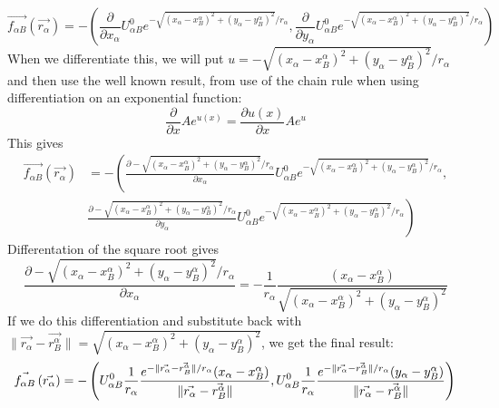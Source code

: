 \begin{itemize}
\begin{equation}
    \vec{f_{\alpha B}} \left( \vec{r_{\alpha}} \right) 
=-\left( \frac{\partial}{\partial x_{\alpha}}U^0_{\alpha B} e^{-\sqrt{(x_{\alpha}-x^{\alpha}_{B})^2+(y_{\alpha}-y^{\alpha}_B)^2} / r_{\alpha} }, \frac{\partial}{\partial y_{\alpha}}U^0_{\alpha B} e^{- \sqrt{(x_{\alpha}-x^{\alpha}_{B})^2+(y_{\alpha}-y^{\alpha}_B)^2} / r_{\alpha} } \right)
\end{equation}
When we differentiate this, we will put $u=-\sqrt{(x_{\alpha}-x^{\alpha}_{B})^2+(y_{\alpha}-y^{\alpha}_B)^2} / r_{\alpha} $ and then use the well known result, from use of the chain rule when using differentiation on an exponential function:
\begin{equation}
\frac{\partial }{\partial x}Ae^{u(x)}=\frac{\partial u(x)}{\partial x}Ae^{u}
\end{equation}
This gives
\begin{equation}
\begin{split}
    \vec{f_{\alpha B}} \left( \vec{r_{\alpha}} \right) 
 & =-\left( \frac{\partial -\sqrt{(x_{\alpha}-x^{\alpha}_{B})^2+(y_{\alpha}-y^{\alpha}_B)^2} / r_{\alpha}}{\partial  x_{\alpha}}U^0_{\alpha B} e^{-\sqrt{(x_{\alpha}-x^{\alpha}_{B})^2+(y_{\alpha}-y^{\alpha}_B)^2} / r_{\alpha} } \right. , \\
& \left. \frac{\partial -\sqrt{(x_{\alpha}-x^{\alpha}_{B})^2+(y_{\alpha}-y^{\alpha}_B)^2} / r_{\alpha}}{\partial y_{\alpha}}U^0_{\alpha B} e^{- \sqrt{(x_{\alpha}-x^{\alpha}_{B})^2+(y_{\alpha}-y^{\alpha}_B)^2} / r_{\alpha} } \right)
\end{split}
\end{equation}
Differentation of the square root gives 
\begin{equation}
 \frac{\partial -\sqrt{(x_{\alpha}-x^{\alpha}_{B})^2+(y_{\alpha}-y^{\alpha}_B)^2} / r_{\alpha}}{\partial x_{\alpha}} =-\frac{1}{r_{\alpha}}\frac{(x_{\alpha}-x_{B}^{\alpha})}{\sqrt{(x_{\alpha}-x^{\alpha}_{B})^2+(y_{\alpha}-y^{\alpha}_B)^2} }
\end{equation}
If we do this differentiation and substitute back with $\| \vec{r_{\alpha}} - \vec{r_{B}^{\alpha}} \|= \sqrt{(x_{\alpha}-x^{\alpha}_{B})^2+(y_{\alpha}-y^{\alpha}_B)^2}$, we get the final result:
\begin{equation}
    \vec{f_{\alpha B}} \left( \vec{r_{\alpha}} \right) 
=-\left(U^0_{\alpha B}\frac{1}{r_{\alpha}}\frac{e^{- \| \vec{r_{\alpha}} - \vec{r_{B}^{\alpha}} \| / r_{\alpha} } (x_{\alpha}-x_B^{\alpha})}{\| \vec{r_{\alpha}} - \vec{r_{B}^{\alpha}} \| },U^0_{\alpha B}\frac{1}{r_{\alpha}}\frac{e^{- \| \vec{r_{\alpha}} - \vec{r_{B}^{\alpha}} \| / r_{\alpha} } (y_{\alpha}-y_B^{\alpha})}{\| \vec{r_{\alpha}} - \vec{r_{B}^{\alpha}} \| }\right) \\
\end{equation}


\end{itemize}
